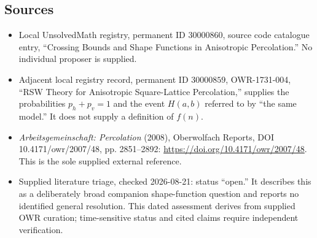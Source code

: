 \documentclass[11pt]{article}
\begin{document}
\subsection{Sources}
\begin{itemize}
\item Local UnsolvedMath registry, permanent ID \(30000860\), source code catalogue entry, ``Crossing Bounds and Shape Functions in Anisotropic Percolation.'' No individual proposer is supplied.
\item Adjacent local registry record, permanent ID \(30000859\), OWR-1731-004, ``RSW Theory for Anisotropic Square-Lattice Percolation,'' supplies the probabilities \(p_h+p_v=1\) and the event \(H(a,b)\) referred to by ``the same model.'' It does not supply a definition of \(f(n)\).
\item \emph{Arbeitsgemeinschaft: Percolation} (2008), Oberwolfach Reports, DOI 10.4171/owr/2007/48, pp. 2851--2892: \url{https://doi.org/10.4171/owr/2007/48}. This is the sole supplied external reference.
\item Supplied literature triage, checked 2026-08-21: status ``open.'' It describes this as a deliberately broad companion shape-function question and reports no identified general resolution. This dated assessment derives from supplied OWR curation; time-sensitive status and cited claims require independent verification.
\end{itemize}
\end{document}
